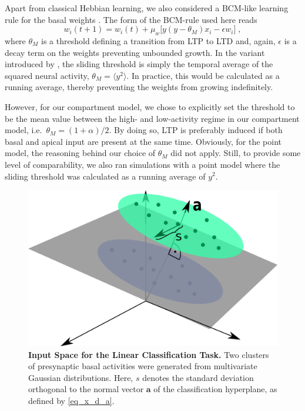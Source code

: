 \documentclass[utf8]{frontiersSCNS} %
\begin{document}
Apart from classical Hebbian learning, we also considered 
a BCM-like learning rule for the basal weights 
\citep{Bienenstock1982,Intrator1992}.
The form of the BCM-rule used here reads
\begin{equation}
w_i(t+1) = w_i(t) + \mu_w \big[ y\left(y - \theta_M\right) x_i - 
\epsilon w_i \big] \; , 
\label{eq_bcm_rule}
\end{equation}
where $\theta_M$ is a threshold defining a 
transition from LTP to LTD and, again, $\epsilon$ 
is a decay term on the weights preventing unbounded 
growth. In the variant introduced by \citet{Law1994}, 
the sliding threshold is simply the temporal average 
of the squared neural activity, 
$\theta_M = \langle y^2 \rangle$. In practice, 
this would be calculated as a running average, 
thereby preventing the weights from growing 
indefinitely.

However, for our compartment model, we chose to explicitly set the
threshold to be the mean value between the high- and low-activity regime
in our compartment model, i.e.\ $\theta_M = (1+\alpha)/2$. By doing so, LTP is
preferably induced if both basal and apical input are present at the same
time.
Obviously, for the point model, the reasoning behind our choice of
$\theta_M$ did not apply. Still, to provide some level of comparability,
we also ran simulations with a point model where the sliding threshold was
calculated as a running average of $y^2$.

\begin{figure}[t]
\centering
\includegraphics[width=0.55\columnwidth]{illustration_classification}
\caption{{\bf Input Space for the Linear Classification Task.}
Two clusters of presynaptic basal activities were generated from 
multivariate Gaussian distributions. Here, $s$ denotes the standard
deviation orthogonal to the normal vector $\mathbf{a}$ of the 
classification hyperplane, as defined by \eqref{eq_x_d_a}.}
\label{fig_illustration_classification}
\end{figure}
\end{document}
